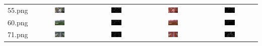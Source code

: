 \begin{table}[htbp]
\begin{tabular}{ccccc}
      55.png & \includegraphics[width=0.2\textwidth]{pic/raw/55.png} & \includegraphics[width=0.2\textwidth]{pic/rcf/55.png} & \includegraphics[width=0.2\textwidth]{pic/hqs/500/55.png} & \includegraphics[width=0.2\textwidth]{pic/gt/55.png} \\
      60.png & \includegraphics[width=0.2\textwidth]{pic/raw/60.png} & \includegraphics[width=0.2\textwidth]{pic/rcf/60.png} & \includegraphics[width=0.2\textwidth]{pic/hqs/500/60.png} & \includegraphics[width=0.2\textwidth]{pic/gt/60.png} \\
      71.png & \includegraphics[width=0.2\textwidth]{pic/raw/71.png} & \includegraphics[width=0.2\textwidth]{pic/rcf/71.png} & \includegraphics[width=0.2\textwidth]{pic/hqs/500/71.png} & \includegraphics[width=0.2\textwidth]{pic/gt/71.png} \\

\end{tabular}
\end{table}

